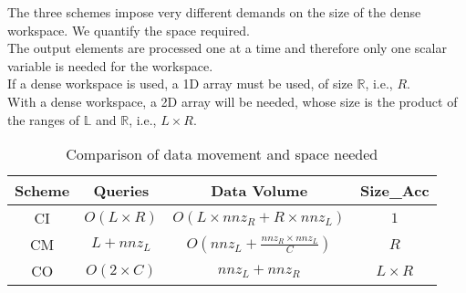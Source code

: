  The three schemes impose very different demands on the size of the dense workspace. We quantify the space required.\\
 The output elements are processed one at a time and therefore only one scalar variable is needed for the workspace.\\
 If a dense workspace is used, a 1D array must be used, of size $\mathbb{R}$, i.e., $R$.\\
 With a dense workspace, a 2D array will be needed, whose size is the product of the ranges of  $\mathbb{L}$ and $\mathbb{R}$, i.e., $L \times R$.
\begin{table}
    \centering
    \caption{Comparison of data movement and space needed}
    \begin{tabular}{|c|c|c|c|} \hline 
         Scheme&  Queries&  Data Volume&  Size\_Acc \\ \hline 
         CI&  $O(L \times R)$&  $O(L \times \mathit{nnz}_R + R \times \mathit{nnz}_L)$ & $1$   \\ \hline 
         CM&  $L+\mathit{nnz}_L$& $O(\mathit{nnz}_L + \frac{\mathit{nnz}_R \times \mathit{nnz}_L}{C})$ & $R$  \\ \hline 
         CO& $O(2 \times C)$ & $\mathit{nnz}_L + \mathit{nnz}_R$ & $L \times R$  \\ \hline
    \end{tabular}
    \label{tab:compare_loop_orders}
\end{table}

